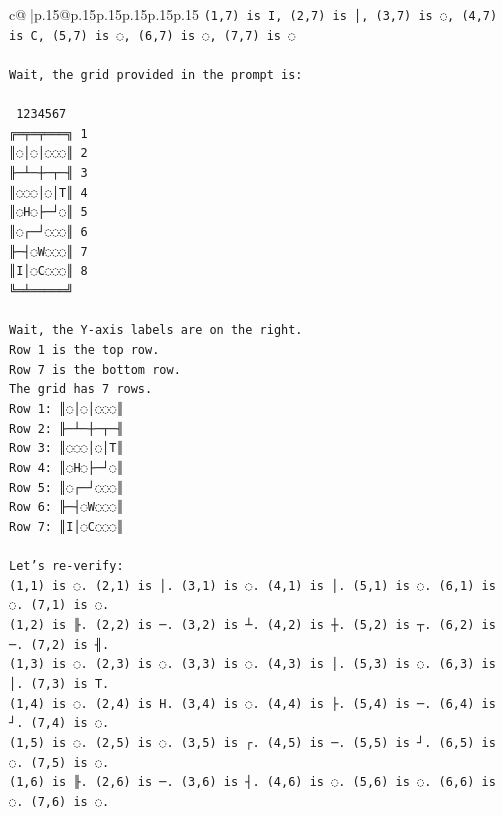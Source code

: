 \documentclass{article}
\begin{document}
{\begin{supertabular}{c@{$\;$}|p{.15\linewidth}@{}p{.15\linewidth}p{.15\linewidth}p{.15\linewidth}p{.15\linewidth}p{.15\linewidth}}
{{{\texttt{(1,7) is I, (2,7) is │, (3,7) is ◌, (4,7) is C, (5,7) is ◌, (6,7) is ◌, (7,7) is ◌} \\
\\ 
\texttt{Wait, the grid provided in the prompt is:} \\
\\ 
\texttt{ 1234567} \\
\texttt{╔═╤═╤═══╗ 1} \\
\texttt{║◌│◌│◌◌◌║ 2} \\
\texttt{╟─┴─┼─┬─╢ 3} \\
\texttt{║◌◌◌│◌│T║ 4} \\
\texttt{║◌H◌├─┘◌║ 5} \\
\texttt{║◌┌─┘◌◌◌║ 6} \\
\texttt{╟─┤◌W◌◌◌║ 7} \\
\texttt{║I│◌C◌◌◌║ 8} \\
\texttt{╚═╧═════╝} \\
\\ 
\texttt{Wait, the Y{-}axis labels are on the right.} \\
\texttt{Row 1 is the top row.} \\
\texttt{Row 7 is the bottom row.} \\
\texttt{The grid has 7 rows.} \\
\texttt{Row 1: ║◌│◌│◌◌◌║} \\
\texttt{Row 2: ╟─┴─┼─┬─╢} \\
\texttt{Row 3: ║◌◌◌│◌│T║} \\
\texttt{Row 4: ║◌H◌├─┘◌║} \\
\texttt{Row 5: ║◌┌─┘◌◌◌║} \\
\texttt{Row 6: ╟─┤◌W◌◌◌║} \\
\texttt{Row 7: ║I│◌C◌◌◌║} \\
\\ 
\texttt{Let's re{-}verify:} \\
\texttt{(1,1) is ◌. (2,1) is │. (3,1) is ◌. (4,1) is │. (5,1) is ◌. (6,1) is ◌. (7,1) is ◌.} \\
\texttt{(1,2) is ╟. (2,2) is ─. (3,2) is ┴. (4,2) is ┼. (5,2) is ┬. (6,2) is ─. (7,2) is ╢.} \\
\texttt{(1,3) is ◌. (2,3) is ◌. (3,3) is ◌. (4,3) is │. (5,3) is ◌. (6,3) is │. (7,3) is T.} \\
\texttt{(1,4) is ◌. (2,4) is H. (3,4) is ◌. (4,4) is ├. (5,4) is ─. (6,4) is ┘. (7,4) is ◌.} \\
\texttt{(1,5) is ◌. (2,5) is ◌. (3,5) is ┌. (4,5) is ─. (5,5) is ┘. (6,5) is ◌. (7,5) is ◌.} \\
\texttt{(1,6) is ╟. (2,6) is ─. (3,6) is ┤. (4,6) is ◌. (5,6) is ◌. (6,6) is ◌. (7,6) is ◌.} \\
}}}
\end{supertabular}}
\end{document}
